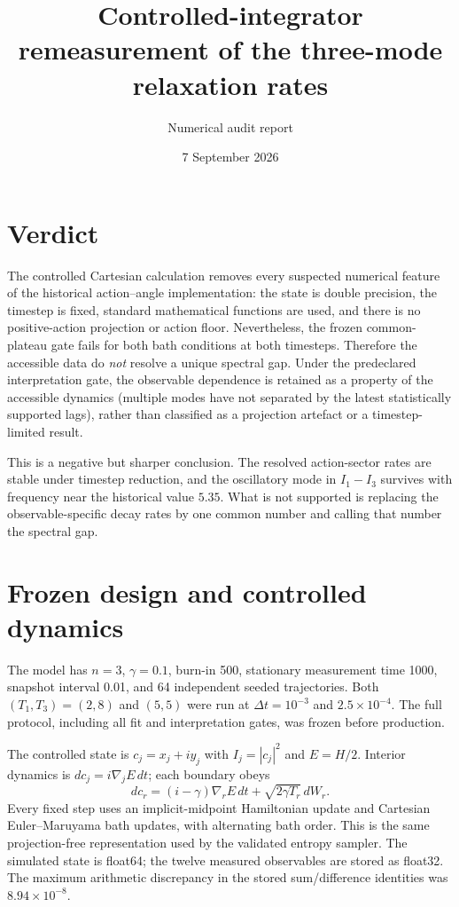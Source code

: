 \documentclass[10pt]{article}
\title{Controlled-integrator remeasurement of the three-mode relaxation rates}
\author{Numerical audit report}
\date{7 September 2026}
\begin{document}
\maketitle

\section*{Verdict}

The controlled Cartesian calculation removes every suspected numerical feature
of the historical action--angle implementation: the state is double precision,
the timestep is fixed, standard mathematical functions are used, and there is
no positive-action projection or action floor.  Nevertheless, the frozen
common-plateau gate fails for both bath conditions at both timesteps.  Therefore
the accessible data do \emph{not} resolve a unique spectral gap.  Under the
predeclared interpretation gate, the observable dependence is retained as a
property of the accessible dynamics (multiple modes have not separated by the
latest statistically supported lags), rather than classified as a projection
artefact or a timestep-limited result.

This is a negative but sharper conclusion.  The resolved action-sector rates
are stable under timestep reduction, and the oscillatory mode in
$I_1-I_3$ survives with frequency near the historical value $5.35$.  What is
not supported is replacing the observable-specific decay rates by one common
number and calling that number the spectral gap.

\section{Frozen design and controlled dynamics}

The model has $n=3$, $\gamma=0.1$, burn-in 500, stationary measurement time
1000, snapshot interval 0.01, and 64 independent seeded trajectories.  Both
$(T_1,T_3)=(2,8)$ and $(5,5)$ were run at $\Delta t=10^{-3}$ and
$2.5\times10^{-4}$.  The full protocol, including all fit and interpretation
gates, was frozen before production.

The controlled state is $c_j=x_j+iy_j$ with $I_j=|c_j|^2$ and $E=H/2$.
Interior dynamics is $dc_j=i\nabla_jE\,dt$; each boundary obeys
\[
dc_r=(i-\gamma)\nabla_rE\,dt+\sqrt{2\gamma T_r}\,dW_r.
\]
Every fixed step uses an implicit-midpoint Hamiltonian update and Cartesian
Euler--Maruyama bath updates, with alternating bath order.  This is the same
projection-free representation used by the validated entropy sampler.  The
simulated state is float64; the twelve measured observables are stored as
float32.  The maximum arithmetic discrepancy in the stored sum/difference
identities was $8.94\times10^{-8}$.
\end{document}
